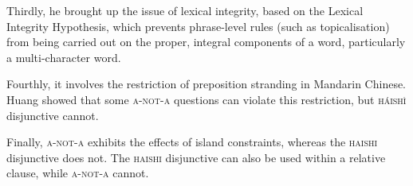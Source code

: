 \documentclass[12pt, UTF8]{article}
\begin{document}
Thirdly, he brought up the issue of lexical integrity, based on the Lexical Integrity Hypothesis, which prevents phrase-level rules (such as topicalisation) from being carried out on the proper, integral components of a word, particularly a multi-character word.

Fourthly, it involves the restriction of preposition stranding in Mandarin Chinese. Huang showed that some \textsc{a-not-a} questions can violate this restriction, but \textsc{h\'{a}ish\`{i}} disjunctive cannot.

\begin{exe}
\end{exe}

Finally, \textsc{a-not-a} exhibits the effects of island constraints, whereas the \textsc{haishi} disjunctive does not. The \textsc{haishi} disjunctive can also be used within a relative clause, while \textsc{a-not-a} cannot.
\end{document}
